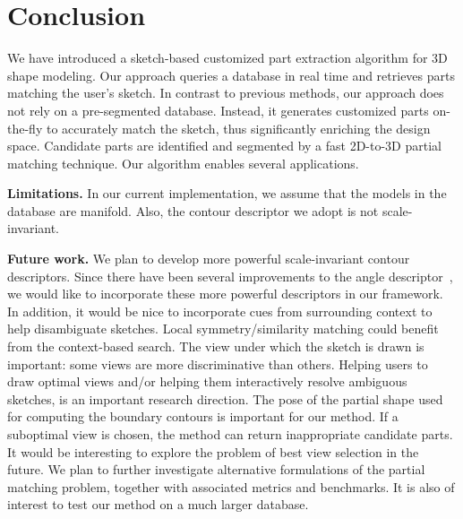 

\section{Conclusion}
We have introduced a sketch-based customized part extraction algorithm for 3D shape modeling. Our approach queries a database in real time and retrieves parts matching the user's sketch. In contrast to previous methods, our approach does not rely on a pre-segmented database. Instead, it generates customized parts on-the-fly to accurately match the sketch, thus significantly enriching the design space. Candidate parts are identified and segmented by a fast 2D-to-3D partial matching technique. Our algorithm enables several applications.

\textbf{Limitations.}  In our current implementation, we assume that the models in the database are manifold. Also, the contour descriptor we adopt is not scale-invariant.

\textbf{Future work.} We plan to develop more powerful scale-invariant contour descriptors. Since there have been several improvements to the angle descriptor~\cite{frompartialshapematchingcvpr}, we would like to incorporate these more powerful descriptors in our framework. In addition, it would be nice to incorporate cues from surrounding context to help disambiguate sketches.
Local symmetry/similarity matching could benefit from the context-based search. The view under which the sketch is drawn is important: some views are more discriminative than others. Helping users to draw optimal views and/or helping them interactively resolve ambiguous sketches, is an important research direction. The pose of the partial shape used for computing the boundary contours is important for our method. If a suboptimal view is chosen, the method can return inappropriate candidate parts. It would be interesting to explore the problem of best view selection in the future. We plan to further investigate alternative formulations of the partial matching problem, together with associated metrics and benchmarks. It is also of interest to test our method on a much larger database. 